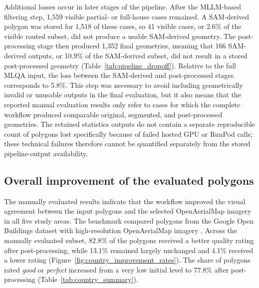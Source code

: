 Additional losses occur in later stages of the pipeline. After the MLLM-based filtering step, 1,559 visible partial- or full-house cases remained. A SAM-derived polygon was stored for 1,518 of these cases, so 41 visible cases, or 2.6\% of the visible routed subset, did not produce a usable SAM-derived geometry. The post-processing stage then produced 1,352 final geometries, meaning that 166 SAM-derived outputs, or 10.9\% of the SAM-derived subset, did not result in a stored post-processed geometry (Table~\ref{tab:pipeline_dropoff}). Relative to the full MLQA input, the loss between the SAM-derived and post-processed stages corresponds to 5.8\%. This step was necessary to avoid including geometrically invalid or unusable outputs in the final evaluation, but it also means that the reported manual evaluation results only refer to cases for which the complete workflow produced comparable original, segmented, and post-processed geometries. The retained statistics outputs do not contain a separate reproducible count of polygons lost specifically because of failed hosted GPU or RunPod calls; these technical failures therefore cannot be quantified separately from the stored pipeline-output availability.

\subsection{Overall improvement of the evaluated polygons}
\label{sec:discussion_overall_effectiveness}

The manually evaluated results indicate that the workflow improved the visual agreement between the input polygons and the selected OpenAerialMap imagery in all five study areas. The benchmark compared polygons from the Google Open Buildings dataset with high-resolution OpenAerialMap imagery \citep{sirko2021continentalscalebuildingdetectionhigh, googleopenbuildings, openaerialmap}. Across the manually evaluated subset, 82.8\% of the polygons received a better quality rating after post-processing, while 13.1\% remained largely unchanged and 4.1\% received a lower rating (Figure~\ref{fig:country_improvement_rates}). The share of polygons rated \textit{good} or \textit{perfect} increased from a very low initial level to 77.8\% after post-processing (Table~\ref{tab:country_summary}).

